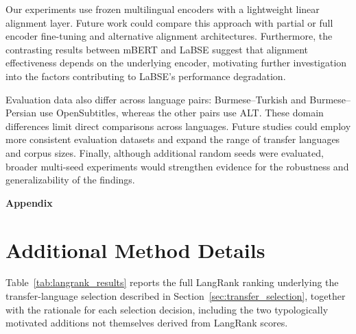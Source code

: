 \documentclass[11pt]{article}
\begin{document}
Our experiments use frozen multilingual encoders
with a lightweight linear alignment layer.
Future work could compare this approach with
partial or full encoder fine-tuning and
alternative alignment architectures. Furthermore, the contrasting
results between mBERT and LaBSE suggest that
alignment effectiveness depends on the underlying
encoder, motivating further investigation into
the factors contributing to LaBSE's performance
degradation.

Evaluation data also differ across language pairs:
Burmese--Turkish and Burmese--Persian use
OpenSubtitles, whereas the other pairs use ALT.
These domain differences limit direct comparisons
across languages. Future studies could employ
more consistent evaluation datasets and expand
the range of transfer languages and corpus sizes.
Finally, although additional random seeds were
evaluated, broader multi-seed experiments would
strengthen evidence for the robustness and
generalizability of the findings.




\appendix

\begin{center}
    \textbf{\Large Appendix}
\end{center}

\section{Additional Method Details}
\label{app:method_details}

Table~\ref{tab:langrank_results} reports the full LangRank ranking underlying the transfer-language selection described in Section~\ref{sec:transfer_selection}, together with the rationale for each selection decision, including the two typologically motivated additions not themselves derived from LangRank scores.
\end{document}
